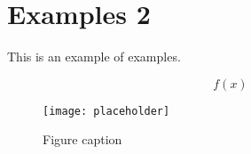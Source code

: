 

\chapter{Examples 2}

This is an example of examples.

\begin{example}
\lipsum[2]
\begin{equation}
f(x)
\end{equation}
\end{example}


\begin{exercise}
\lipsum[2]
\end{exercise}


\begin{problem}
\lipsum[2]
\end{problem}

\begin{figure}[h]
\centering\texttt{[image: placeholder]}
\caption{Figure caption}
\end{figure}

